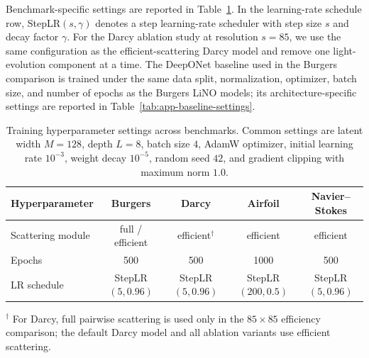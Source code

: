 \documentclass{article}
\begin{document}
Benchmark-specific settings are reported in Table~\ref{tab:app-training-settings}. In the learning-rate schedule row, StepLR$(s,\gamma)$ denotes a step learning-rate scheduler with step size $s$ and decay factor $\gamma$. For the Darcy ablation study at resolution $s=85$, we use the same configuration as the efficient-scattering Darcy model and remove one light-evolution component at a time. The DeepONet baseline used in the Burgers comparison is trained under the same data split, normalization, optimizer, batch size, and number of epochs as the Burgers LiNO models; its architecture-specific settings are reported in Table~\ref{tab:app-baseline-settings}.

\begin{table}[htbp]
\centering
\caption{Training hyperparameter settings across benchmarks. Common settings are latent width 
$M=128$, depth $L=8$, batch size $4$, AdamW optimizer, initial learning rate $10^{-3}$, weight decay 
$10^{-5}$, random seed $42$, and gradient clipping with maximum norm $1.0$.}
\label{tab:app-training-settings}
\small
\setlength{\tabcolsep}{6pt}
\begin{tabular}{lcccc}
\toprule
\textbf{Hyperparameter} 
& \textbf{Burgers} 
& \textbf{Darcy} 
& \textbf{Airfoil} 
& \textbf{Navier--Stokes} \\
\midrule
Scattering module 
& full / efficient 
& efficient$^\dagger$ 
& efficient 
& efficient \\
Epochs 
& 500 
& 500 
& 1000 
& 500 \\
LR schedule 
& StepLR$(5,0.96)$ 
& StepLR$(5,0.96)$ 
& StepLR$(200,0.5)$ 
& StepLR$(5,0.96)$ \\
\bottomrule
\end{tabular}

\vspace{0.4em}
\begin{minipage}{0.95\linewidth}
\footnotesize
$^\dagger$ For Darcy, full pairwise scattering is used only in the $85\times85$ efficiency comparison; 
the default Darcy model and all ablation variants use efficient scattering.
\end{minipage}
\end{table}
\end{document}

